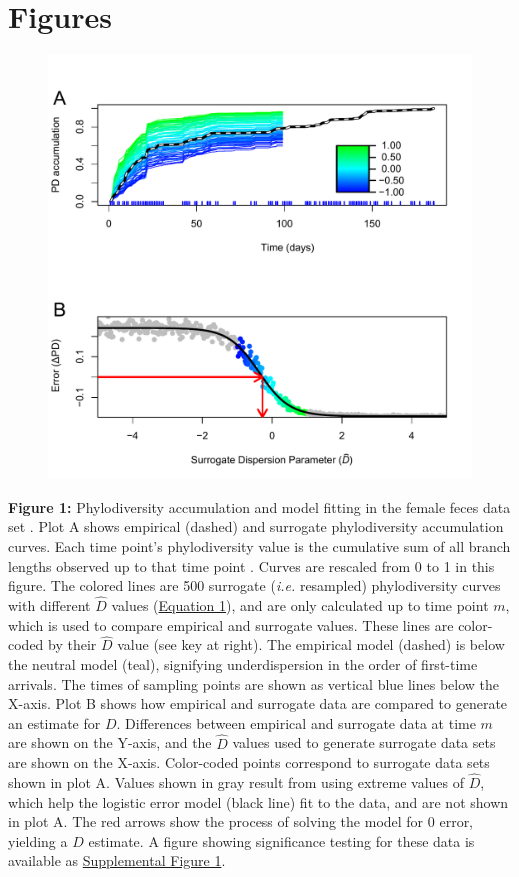 \documentclass{article}
\begin{document}
\section{Figures}
{\parindent0pt %
\begin{figure}[ht]
	\centering
	\includegraphics[scale=0.80]{figs/Fig_1.pdf}
\end{figure}
\textbf{Figure 1:}\label{sec:figure1} Phylodiversity accumulation and model fitting in the female feces data set \cite{Caporaso2011}. Plot A shows empirical (dashed) and surrogate phylodiversity accumulation curves. Each time point's phylodiversity value is the cumulative sum of all branch lengths observed up to that time point \cite{Faith1992}. Curves are rescaled from 0 to 1 in this figure. The colored lines are 500 surrogate (\emph{i.e.} resampled) phylodiversity curves with different \(\hat{D}\) values (\hyperref[sec:equation1]{Equation 1}), and are only calculated up to time point \(m\), which is used to compare empirical and surrogate values. These lines are color-coded by their \(\hat{D}\) value (see key at right). The empirical model (dashed) is below the neutral model (teal), signifying underdispersion in the order of first-time arrivals. The times of sampling points are shown as vertical blue lines below the X-axis. Plot B shows how empirical and surrogate data are compared to generate an estimate for \(D\). Differences between empirical and surrogate data at time \(m\) are shown on the Y-axis, and the \(\hat{D}\) values used to generate surrogate data sets are shown on the X-axis. Color-coded points correspond to surrogate data sets shown in plot A. Values shown in gray result from using extreme values of \(\hat{D}\), which help the logistic error model (black line) fit to the data, and are not shown in plot A. The red arrows show the process of solving the model for 0 error, yielding a \(D\) estimate. A figure showing significance testing for these data is available as \hyperref[sec:figureS1]{Supplemental Figure 1}.
\newpage

}
\end{document}
